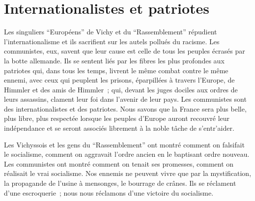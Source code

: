 \documentclass[french,twoside]{book} %
\begin{document}
\section[{Internationalistes et patriotes}]{Internationalistes et patriotes}
\noindent Les singuliers “Européens” de Vichy et du “Rassemblement” répudient l’internationalisme et ils sacrifient sur les autels pollués du racisme. Les communistes, eux, savent que leur cause est celle de tous les peuples écrasés par la botte allemande. Ils se sentent liés par les fibres les plus profondes aux patriotes qui, dans tous les temps, livrent le même combat contre le même ennemi, avec ceux qui peuplent les prisons, éparpillées à travers l’Europe, de Himmler et des amis de Himmler ; qui, devant les juges dociles aux ordres de leurs assassins, clament leur foi dans l’avenir de leur pays. Les communistes sont des internationalistes et des patriotes. Nous savons que la France sera plus belle, plus libre, plus respectée lorsque les peuples d’Europe auront recouvré leur indépendance et se seront associés librement à la noble tâche de s’entr’aider.\par
Les Vichyssois et les gens du “Rassemblement” ont montré comment on falsifait le socialisme, comment on aggravait l’ordre ancien en le baptisant ordre nouveau. Les communistes ont montré comment on tenait ses promesses, comment on réalisait le vrai socialisme. Nos ennemis ne peuvent vivre que par la mystification, la propagande de l’usine à mensonges, le bourrage de crânes. Ils se réclament d’une escroquerie ; nous nous réclamons d’une victoire du socialisme.
\end{document}
